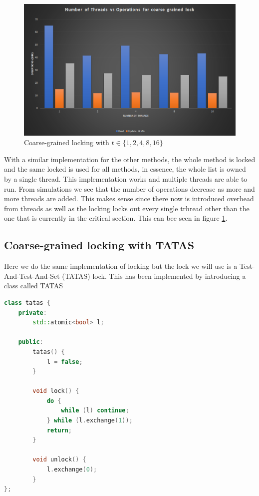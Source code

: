 \begin{figure}
    \centering
    \includegraphics[width=\linewidth]{Figures/coarsegrained.png}
    \caption{Coarse-grained locking with $t \in \{1, 2, 4, 8, 16\}$}
    \label{fig:coarsegrained}
\end{figure}

With a similar implementation for the other methods, the whole method is locked
and the same locked is used for all methods, in essence, the whole list is owned
by a single thread. This implementation works and multiple threads are able to 
run. From simulations we see that the number of operations decrease as more and
more threads are added. This makes sense since there now is introduced overhead
from threads as well as the locking locks out every single trhread other than 
the one that is currently in the critical section. This can bee seen in figure
\ref{fig:coarsegrained}.

\subsection{Coarse-grained locking with TATAS}
Here we do the same implementation of locking but the lock we will use is a
Test-And-Test-And-Set (TATAS) lock. This has been implemented by introducing a 
class called TATAS

\begin{lstlisting}[language=C++, caption=TATAS Class]
class tatas {
	private:
		std::atomic<bool> l;

	public:
		tatas() {
			l = false;
		}

		void lock() {
			do {
				while (l) continue;
			} while (l.exchange(1));
			return;
		}

		void unlock() {
			l.exchange(0);
		}
};
\end{lstlisting}

